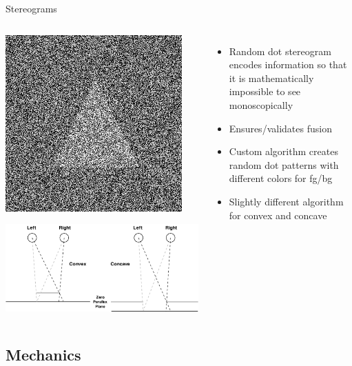 \documentclass[12pt,ucs,hyperref={pdftext}]{beamer}
\newlength{\columnleft}
\newlength{\columnright}
\begin{document}
\begin{frame}{Stereograms}
\begin{columns}

\column{\columnleft}
\begin{center}
\includegraphics[scale=0.25]{screenshots/rds_example.png}

\bigskip

\includegraphics[scale=0.25]{media/rds.pdf}
\end{center}

\column{\columnright}
\begin{itemize}%
\item Random dot stereogram encodes information so that it is mathematically impossible to see monoscopically
\item Ensures/validates fusion
\item Custom algorithm creates random dot patterns with different colors for fg/bg
\item Slightly different algorithm for convex and concave
\end{itemize}

\end{columns}
\end{frame}


\subsection{Mechanics}
\end{document}
